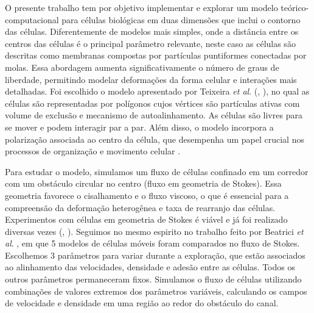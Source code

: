 \documentclass{article}
\theoremstyle{definition}
\begin{document}
O presente trabalho tem por objetivo implementar e explorar um modelo teórico-computacional para células biológicas em duas dimensões que inclui o contorno das células. Diferentemente de modelos mais simples, onde a distância entre os centros das células é o principal parâmetro relevante, neste caso as células são descritas como membranas compostas por partículas puntiformes conectadas por molas. Essa abordagem aumenta significativamente o número de graus de liberdade, permitindo modelar deformações da forma celular e interações mais detalhadas. Foi escolhido o modelo apresentado por Teixeira \textit{et al}. (\cite{teixeira_single_2021}, \cite{teixeira_segregation_2024}), no qual as células são representadas por polígonos cujos vértices são partículas ativas com volume de exclusão e mecanismo de autoalinhamento. As células são livres para se mover e podem interagir par a par. Além disso, o modelo incorpora a polarização associada ao centro da célula, que desempenha um papel crucial nos processos de organização e movimento celular \cite{glazenburg_polarization_2023}.


Para estudar o modelo, simulamos um fluxo de células confinado em um corredor com um obstáculo circular no centro (fluxo em geometria de Stokes). Essa geometria favorece o cisalhamento e o fluxo viscoso, o que é essencial para a compreensão da deformação heterogênea e taxa de rearranjo das células. Experimentos com células em geometria de Stokes é viável e já foi realizado diversas vezes (\cite{kim_propulsion_2013}, \cite{duran_2020}). 
Seguimos no mesmo espirito no trabalho feito por Beatrici \textit{et al}. \cite{beatrici_comparing_2023}, em que 5 modelos de células móveis foram comparados no fluxo de Stokes. Escolhemos 3 parâmetros para variar durante a exploração, que estão associados ao alinhamento das velocidades, densidade e adesão entre as células. Todos os outros parâmetros permaneceram fixos. Simulamos o fluxo de células utilizando combinações de valores extremos dos parâmetros variáveis, calculando os campos de velocidade e densidade em uma região ao redor do obstáculo do canal.
\end{document}
